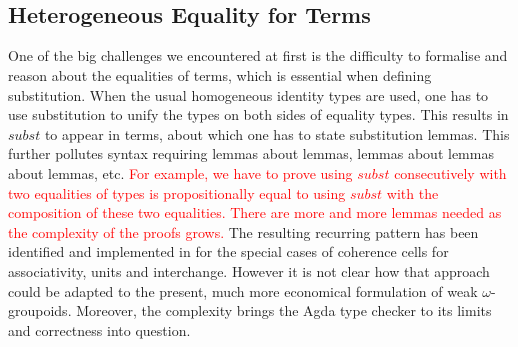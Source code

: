 \documentclass{acm_proc_article-sp}
\newcommand{\wog}{weak $\omega$-groupoids}
\newcommand{\new}{\textcolor{red}}
\begin{document}
\begin{code}%
\>   \<%
\\
\>[0]\<[2]%
\>[2]\AgdaInductiveConstructor{*} \<[8]%
\>[8]\AgdaSymbol{:}  \<%
\\
\>[0]\<[2]%
\>[2] \<[8]%
\>[8]\AgdaSymbol{:} \AgdaSymbol{\{} \AgdaSymbol{:}  \AgdaSymbol{\}(}  \AgdaSymbol{:}  \AgdaSymbol{)}   \<%
\end{code}

\subsection{Heterogeneous Equality for Terms}

One of the big challenges we encountered at first is the difficulty to
formalise and reason about the equalities of terms, which is
essential when defining substitution.  When the usual homogeneous identity types
are used, one has to use substitution to unify
the types on both sides of equality types. This results in
$\mathit{subst}$ to appear in terms, about which one has to state
substitution lemmas. This further pollutes syntax requiring lemmas
about lemmas, lemmas about lemmas about lemmas, etc. \new{For example, we have to prove using $\mathit{subst}$ consecutively with two equalities of types is propositionally equal to using $\mathit{subst}$ with the composition of these two equalities. There are more and more lemmas needed as the complexity of the proofs grows.} The resulting
recurring pattern has been identified and implemented in
\cite{txa:csl} for the special cases of coherence cells for
associativity, units and interchange. However it is not clear how that
approach could be adapted to the present, much more economical
formulation of {\wog}. Moreover, the complexity brings the
Agda type checker to its limits and correctness into question.
\end{document}
